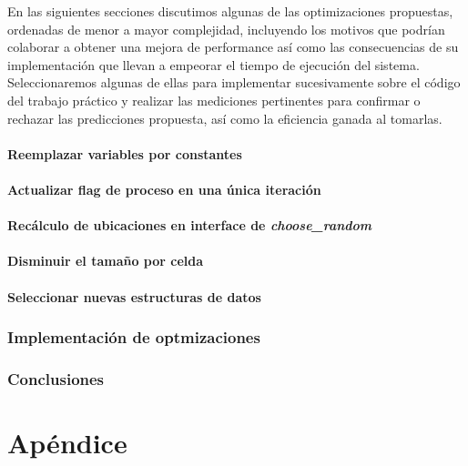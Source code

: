 \documentclass[a4paper,11pt]{article}
\begin{document}
En las siguientes secciones discutimos algunas de las optimizaciones
propuestas, ordenadas de menor a mayor complejidad, incluyendo los motivos que
podrían colaborar a obtener una mejora de performance así como las
consecuencias de su implementación que llevan a empeorar el tiempo de ejecución
del sistema. Seleccionaremos algunas de ellas para implementar sucesivamente
sobre el código del trabajo práctico y realizar las mediciones pertinentes para
confirmar o rechazar las predicciones propuesta, así como la eficiencia ganada
al tomarlas.

\subsection{Reemplazar variables por constantes}

\subsection{Actualizar flag de proceso en una única iteración}

\subsection{Recálculo de ubicaciones en interface de \textit{choose\_random}}

\subsection{Disminuir el tamaño por celda}

\subsection{Seleccionar nuevas estructuras de datos}


\section{Implementación de optmizaciones}

\section{Conclusiones}


\clearpage

\part{Apéndice}
\appendix
\end{document}

